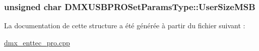 \hypertarget{struct_d_m_x_u_s_b_p_r_o_set_params_type_adae7671559ec6924d03fd27f50d6fda0}{
\subsubsection[{User\-Size\-M\-S\-B}]{\setlength{\rightskip}{0pt plus 5cm}unsigned char D\-M\-X\-U\-S\-B\-P\-R\-O\-Set\-Params\-Type\-::\-User\-Size\-M\-S\-B}}\label{struct_d_m_x_u_s_b_p_r_o_set_params_type_adae7671559ec6924d03fd27f50d6fda0}


La documentation de cette structure a été générée à partir du fichier suivant \-:\begin{DoxyCompactItemize}
\item 
\hyperlink{dmx__enttec__pro_8cpp}{dmx\-\_\-enttec\-\_\-pro.\-cpp}\end{DoxyCompactItemize}
